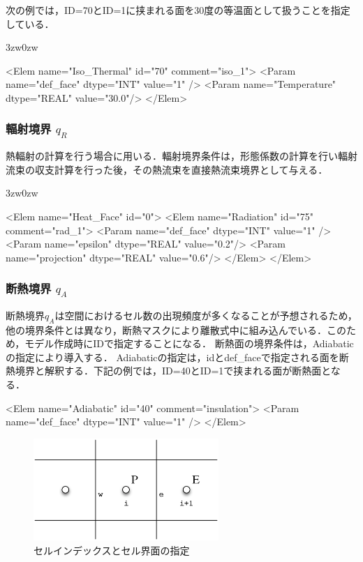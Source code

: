 次の例では，ID=70とID=1に挟まれる面を30度の等温面として扱うことを指定している．

\begin{indentation}{3zw}{0zw}
{
\small
\begin{program}
<Elem name="Iso_Thermal" id="70"  comment="iso_1">
  <Param name="def_face"    dtype="INT"    value="1" />
  <Param name="Temperature" dtype="REAL" value="30.0"/>
</Elem>
\end{program}
}
\end{indentation}

%
\subsubsection{輻射境界 $q_R$}
熱輻射の計算を行う場合に用いる．輻射境界条件は，形態係数の計算を行い輻射流束の収支計算を行った後，その熱流束を直接熱流束境界として与える．

\begin{indentation}{3zw}{0zw}
{
\small
\begin{program}
<Elem name="Heat_Face" id="0">
  <Elem name="Radiation" id="75"  comment="rad_1">
    <Param name="def_face"    dtype="INT"    value="1" />
    <Param name="epsilon" dtype="REAL" value="0.2"/>
    <Param name="projection" dtype="REAL" value="0.6"/>
  </Elem>
</Elem>
\end{program}
}
\end{indentation}

%
\subsubsection{断熱境界 $q_A$}
断熱境界$q_A$は空間におけるセル数の出現頻度が多くなることが予想されるため，他の境界条件とは異なり，断熱マスクにより離散式中に組み込んでいる．このため，モデル作成時にIDで指定することになる．
断熱面の境界条件は，Adiabatic の指定により導入する．
Adiabaticの指定は，idとdef\_faceで指定される面を断熱境界と解釈する．下記の例では，ID=40とID=1で挟まれる面が断熱面となる．

{
\small
\begin{program}
<Elem name="Adiabatic" id="40" comment="insulation">
  <Param name="def_face"    dtype="INT"    value="1" />
</Elem>
\end{program}
}

\begin{figure}[htdp]
\begin{center}
\includegraphics[width=7cm,clip]{AdiabaticBC.eps}
\caption{セルインデックスとセル界面の指定}
\label{fig:face definition}
\end{center}
\end{figure}

